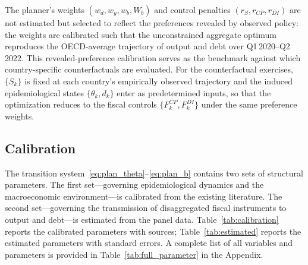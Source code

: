 \documentclass[12pt, a4paper]{article}
\begin{document}
The planner's weights $(w_d, w_y, w_b, W_b)$ and control penalties $(r_S, r_{CP}, r_{DI})$ are not estimated but selected to reflect the preferences revealed by observed policy: the weights are calibrated such that the unconstrained aggregate optimum reproduces the OECD-average trajectory of output and debt over Q1\,2020--Q2\,2022. This revealed-preference calibration serves as the benchmark against which country-specific counterfactuals are evaluated. For the counterfactual exercises, $\{S_k\}$ is fixed at each country's empirically observed trajectory and the induced epidemiological states $\{\theta_k, d_k\}$ enter as predetermined inputs, so that the optimization reduces to the fiscal controls $\{F^{CP}_k, F^{DI}_k\}$ under the same preference weights.

\subsection{Calibration}

\noindent The transition system~\eqref{eq:plan_theta}--\eqref{eq:plan_b} contains two sets of structural parameters. The first set---governing epidemiological dynamics and the macroeconomic environment---is calibrated from the existing literature. The second set---governing the transmission of disaggregated fiscal instruments to output and debt---is estimated from the panel data. Table~\ref{tab:calibration} reports the calibrated parameters with sources; Table~\ref{tab:estimated} reports the estimated parameters with standard errors. A complete list of all variables and parameters is provided in Table~\ref{tab:full_parameter} in the Appendix.
\end{document}
